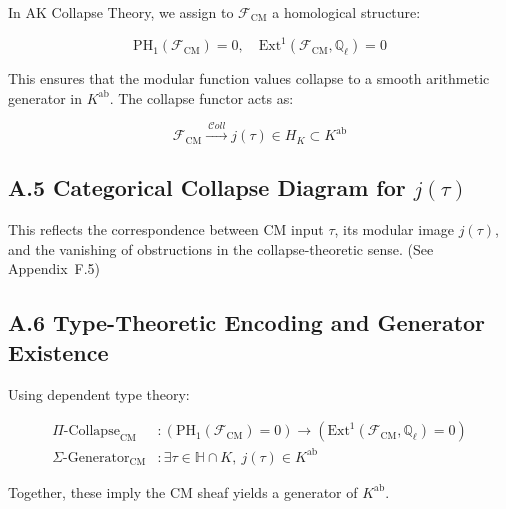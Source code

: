 \documentclass[11pt]{article}
\begin{document}
In AK Collapse Theory, we assign to \( \mathcal{F}_{\mathrm{CM}} \) a homological structure:

\[
\mathrm{PH}_1(\mathcal{F}_{\mathrm{CM}}) = 0, \quad \mathrm{Ext}^1(\mathcal{F}_{\mathrm{CM}}, \mathbb{Q}_\ell) = 0
\]

This ensures that the modular function values collapse to a smooth arithmetic generator in \( K^{\mathrm{ab}} \). The collapse functor acts as:

\[
\mathcal{F}_{\mathrm{CM}} \xrightarrow{\ \mathcal{C}oll\ } j(\tau) \in H_K \subset K^{\mathrm{ab}}
\]

\subsection*{A.5 Categorical Collapse Diagram for \( j(\tau) \)}

\begin{center}
\end{center}

This reflects the correspondence between CM input \( \tau \), its modular image \( j(\tau) \), and the vanishing of obstructions in the collapse-theoretic sense. (See Appendix~F.5)

\subsection*{A.6 Type-Theoretic Encoding and Generator Existence}

Using dependent type theory:

\begin{align*}
\Pi\text{-Collapse}_{\mathrm{CM}} &\colon \left( \mathrm{PH}_1(\mathcal{F}_{\mathrm{CM}}) = 0 \right) \rightarrow \left( \mathrm{Ext}^1(\mathcal{F}_{\mathrm{CM}}, \mathbb{Q}_\ell) = 0 \right) \\
\Sigma\text{-Generator}_{\mathrm{CM}} &\colon \exists \tau \in \mathbb{H} \cap K,\ j(\tau) \in K^{\mathrm{ab}}
\end{align*}

Together, these imply the CM sheaf yields a generator of \( K^{\mathrm{ab}} \).
\end{document}
